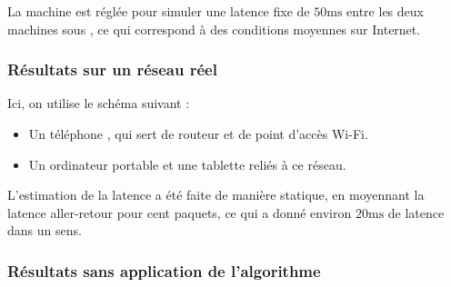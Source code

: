 La machine  est réglée pour simuler une latence fixe de $\num{50}\si{\milli\second}$ entre les deux machines sous , ce qui correspond à des conditions moyennes sur Internet.

\subsubsection{Résultats sur un réseau réel}
Ici, on utilise le schéma suivant : 

\begin{itemize}
	\item Un téléphone , qui sert de routeur et de point d'accès Wi-Fi.
	\item Un ordinateur portable et une tablette  reliés à ce réseau.
\end{itemize}

L'estimation de la latence a été faite de manière statique, en moyennant la latence aller-retour pour cent paquets, ce qui a donné environ $\num{20} \si{\milli\second}$ de latence dans un sens.


\subsubsection{Résultats sans application de l'algorithme}

